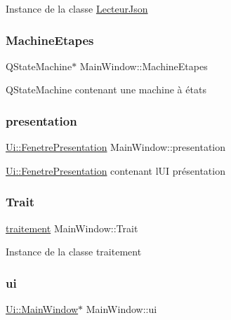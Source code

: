 Instance de la classe \hyperlink{class_lecteur_json}{Lecteur\+Json} \mbox{\label{class_main_window_ae4e608b1c0ba194f1e1a1e09905182e2}} 
\subsubsection{\texorpdfstring{Machine\+Etapes}{MachineEtapes}}
{\footnotesize\ttfamily Q\+State\+Machine$\ast$ Main\+Window\+::\+Machine\+Etapes\hspace{0.3cm}{\ttfamily [private]}}

Q\+State\+Machine contenant une machine à états \mbox{\label{class_main_window_a12b3703287f602303f92ced702c2b88f}} 
\subsubsection{\texorpdfstring{presentation}{presentation}}
{\footnotesize\ttfamily \hyperlink{class_ui_1_1_fenetre_presentation}{Ui\+::\+Fenetre\+Presentation} Main\+Window\+::presentation\hspace{0.3cm}{\ttfamily [private]}}

\hyperlink{class_ui_1_1_fenetre_presentation}{Ui\+::\+Fenetre\+Presentation} contenant l\textquotesingle{}UI présentation \mbox{\label{class_main_window_a1dfb1b1b22d99fccae16abadec84523f}} 
\subsubsection{\texorpdfstring{Trait}{Trait}}
{\footnotesize\ttfamily \hyperlink{classtraitement}{traitement} Main\+Window\+::\+Trait\hspace{0.3cm}{\ttfamily [private]}}

Instance de la classe traitement \mbox{\label{class_main_window_a35466a70ed47252a0191168126a352a5}} 
\subsubsection{\texorpdfstring{ui}{ui}}
{\footnotesize\ttfamily \hyperlink{class_ui_1_1_main_window}{Ui\+::\+Main\+Window}$\ast$ Main\+Window\+::ui\hspace{0.3cm}{\ttfamily [private]}}

